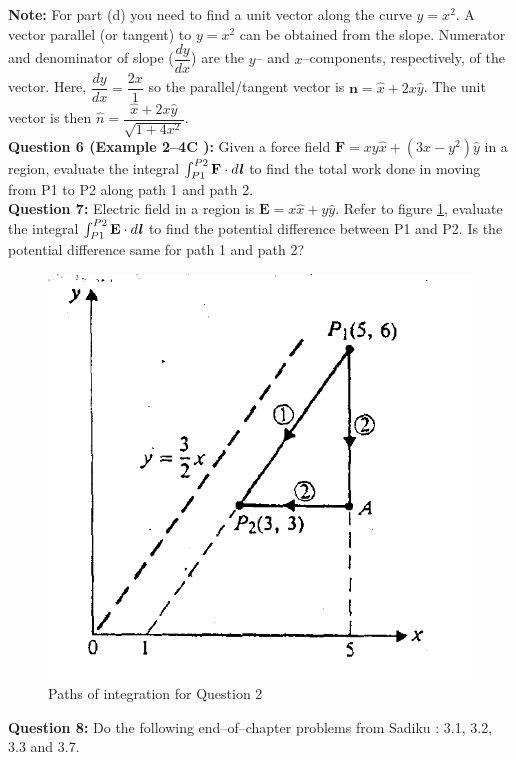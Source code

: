 \documentclass[12pt,a4paper]{article}
\begin{document}
\noindent\textbf{Note:} For part (d) you need to find a unit vector along the curve $y=x^2$. A vector parallel (or tangent) to $y=x^2$ can be obtained from the slope. Numerator and denominator of slope ($\dfrac{dy}{dx}$) are the $y$-- and $x$--components, respectively, of the vector. Here, $\dfrac{dy}{dx}=\dfrac{2x}{1}$ so the parallel/tangent vector is $\textbf{n}=\hat x+2x\hat y$. The unit vector is then $\hat n=\dfrac{\hat x+2x\hat y}{\sqrt{1+4x^2}}$.\\[0.2cm]
\noindent\textbf{Question 6 (Example 2--4C \cite[Example 2--4, page 23]{Cheng}):} Given a force field $\textbf{F}=xy\hat x+(3x-y^2)\hat y$ in a region, evaluate the integral $\int_{P1}^{P2}\textbf{F}\cdot d\textbf{\textit{l}}$ to find the total work done in moving from P1 to P2 along path 1 and path 2.\\[0.2cm]
\noindent\textbf{Question 7:} Electric field in a region is $\textbf{E}=x\hat x+y\hat y$. Refer to figure \ref{Cheng-integral}, evaluate the integral $\int_{P1}^{P2}\textbf{E}\cdot d\textbf{\textit{l}}$ to find the potential difference between P1 and P2. Is the potential difference same for path 1 and path 2?
\begin{figure}[H]
\centering
\includegraphics[scale=0.6]{Figure2-10Cheng.png}
\caption{Paths of integration for Question 2 \cite[Figure 2--10, page 23]{Cheng}}
\label{Cheng-integral}
\end{figure}
\noindent\textbf{Question 8:} Do the following end--of--chapter problems from Sadiku \cite[Page 93 and 94]{Sadiku}: 3.1, 3.2, 3.3 and 3.7.


\end{document}
